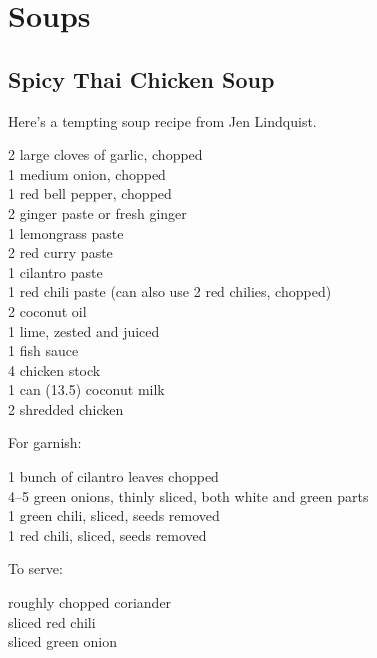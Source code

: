 \chapter{Soups}

\section{Spicy Thai Chicken Soup}

\begin{open}
    Here's a tempting soup recipe from Jen Lindquist.
\end{open}
\begin{ingredients}
    2 large cloves of garlic, chopped\\
    1 medium onion, chopped\\
    1 red bell pepper, chopped\\
    \SI{2}{\tblspoon} ginger paste or fresh ginger\\
    \SI{1}{\tblspoon} lemongrass paste\\
    \SI{2}{\tblspoon} red curry paste\\
    \SI{1}{\tblspoon} cilantro paste\\
    \SI{1}{\tblspoon} red chili paste (can also use 2 red chilies, chopped)\\
    \SI{2}{\tblspoon} coconut oil\\
    1 lime, zested and juiced\\
    \SI{1}{\tblspoon} fish sauce\\
    \SI{4}{\cup} chicken stock\\
    1 can (\SI{13.5}{\fluidounce}) coconut milk\\
    \SI{2}{\cup} shredded chicken
\end{ingredients}
For garnish:
\begin{ingredients}
    1 bunch of cilantro leaves chopped\\
    \numrange{4}{5} green onions, thinly sliced, both white and green parts\\
    1 green chili, sliced, seeds removed\\
    1 red chili, sliced, seeds removed
\end{ingredients}
To serve:
\begin{ingredients}
    roughly chopped coriander\\
    sliced red chili\\
    sliced green onion
\end{ingredients}
